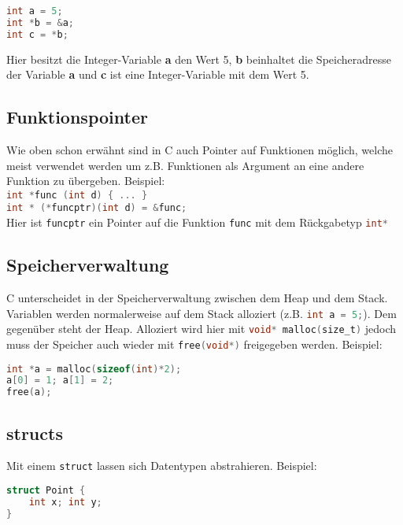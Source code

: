 \documentclass[11pt]{scrartcl}
\begin{document}
\begin{lstlisting}[language=C]
int a = 5;
int *b = &a;
int c = *b;
\end{lstlisting}

Hier besitzt die Integer-Variable \textbf a den Wert 5, \textbf b beinhaltet die Speicheradresse der Variable \textbf a und \textbf c ist eine Integer-Variable mit dem Wert 5.

\subsection{Funktionspointer}
Wie oben schon erwähnt sind in C auch Pointer auf Funktionen möglich, welche meist verwendet werden um z.B. Funktionen als Argument an eine andere Funktion zu übergeben. Beispiel:\\

\lstinline[language=C]!int *func (int d) { ... }!\\

\lstinline[language=C]!int * (*funcptr)(int d) = &func;! \\

Hier ist \lstinline[language=C]!funcptr! ein Pointer auf die Funktion \lstinline[language=C]!func! mit dem Rückgabetyp \lstinline[language=C]!int*!

\subsection{Speicherverwaltung}
C unterscheidet in der Speicherverwaltung zwischen dem Heap und dem Stack. Variablen werden normalerweise auf dem Stack alloziert (z.B. \lstinline[language=C]{int a = 5;}). Dem gegenüber steht der Heap. Alloziert wird hier mit \lstinline[language=C]{void* malloc(size_t)} jedoch muss der Speicher auch wieder mit \lstinline[language=C]{free(void*)} freigegeben werden. Beispiel:\\

\begin{lstlisting}[language=C]
int *a = malloc(sizeof(int)*2);
a[0] = 1; a[1] = 2;
free(a);
\end{lstlisting}

\subsection{structs}
Mit einem \texttt{struct} lassen sich Datentypen abstrahieren. Beispiel:\\

\begin{lstlisting}[language=C]
struct Point {
	int x; int y;
}
\end{lstlisting}
\end{document}
